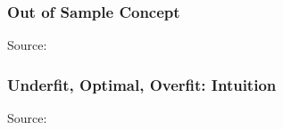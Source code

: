 \documentclass{beamer}
\begin{document}
\begin{frame}
  \frametitle{Out of Sample Concept}
  \hspace*{15pt}\hbox{\scriptsize Source:}
\end{frame}


\begin{frame}
  \frametitle{Underfit, Optimal, Overfit: Intuition}
  \hspace*{15pt}\hbox{\scriptsize Source:}
\end{frame}
\end{document}
